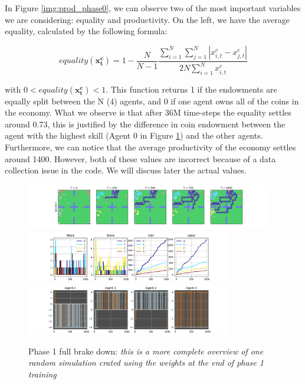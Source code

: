 In Figure \ref{img:prod_phase0}, we can observe two of the most important variables we are considering: equality and productivity. On the left, we have the average equality, calculated by the following formula:

\begin{equation}
    equality(\mathbf{x^c_{t}}) = 1 - \frac{N}{N-1} \frac{\sum^N_{i=1}\sum^N_{j=1}| x^c_{i,t} - x^c_{j,t}|}{2N\sum^N_{i=1}x^c_{i,t}}
\end{equation}

with \( 0 < equality(\mathbf{x^c_{t}}) < 1 \). This function returns 1 if the endowments are equally split between the N (4) agents, and 0 if one agent owns all of the coins in the economy. What we observe is that after 36M time-steps the equality settles around 0.73, this is justified by the difference in coin endowment between the agent with the highest skill (Agent 0 in Figure \ref{img:p0_brakedown}) and the other agents. Furthermore, we can notice that the average productivity of the economy settles around 1400. However, both of these values are incorrect because of a data collection issue in the code. We will discuss later the actual values.


\begin{figure}[h!]
    \centering
    \linespread{.9}
    \includegraphics[width=0.95\textwidth]{Resources/imgs/Figure_1.png}
    \includegraphics[width=0.80\textwidth]{Resources/imgs/Figure_2.png}
    \includegraphics[width=0.80\textwidth]{Resources/imgs/Figure_3.png}
    \caption[Phase 1 full brake down: ]%
    {\label{img:p0_brakedown}Phase 1 full brake down: \small \textit{this is a more complete overview of one random simulation crated using the weights at the end of phase 1 training}}
\end{figure}

